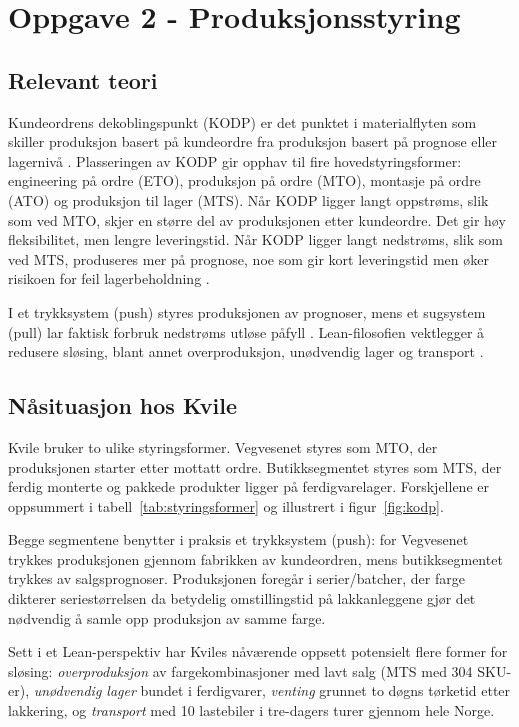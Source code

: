 \section*{Oppgave 2 - Produksjonsstyring}
\setcounter{section}{2}

\setcounter{subsection}{0}
\subsection{Relevant teori}
Kundeordrens dekoblingspunkt (KODP) er det punktet i materialflyten som skiller produksjon basert på kundeordre fra produksjon basert på prognose eller lagernivå \parencite{strandhagen2024}. Plasseringen av KODP gir opphav til fire hovedstyringsformer: engineering på ordre (ETO), produksjon på ordre (MTO), montasje på ordre (ATO) og produksjon til lager (MTS). Når KODP ligger langt oppstrøms, slik som ved MTO, skjer en større del av produksjonen etter kundeordre. Det gir høy fleksibilitet, men lengre leveringstid. Når KODP ligger langt nedstrøms, slik som ved MTS, produseres mer på prognose, noe som gir kort leveringstid men øker risikoen for feil lagerbeholdning \parencite{slack2019}.

I et trykksystem (push) styres produksjonen av prognoser, mens et sugsystem (pull) lar faktisk forbruk nedstrøms utløse påfyll \parencite{strandhagen2024}. Lean-filosofien vektlegger å redusere sløsing, blant annet overproduksjon, unødvendig lager og transport \parencite{strandhagen2024}.


\subsection{Nåsituasjon hos Kvile}

Kvile bruker to ulike styringsformer. Vegvesenet styres som MTO, der produksjonen starter etter mottatt ordre. Butikksegmentet styres som MTS, der ferdig monterte og pakkede produkter ligger på ferdigvarelager. Forskjellene er oppsummert i tabell~\ref{tab:styringsformer} og illustrert i figur~\ref{fig:kodp}.

Begge segmentene benytter i praksis et trykksystem (push): for Vegvesenet trykkes produksjonen gjennom fabrikken av kundeordren, mens butikksegmentet trykkes av salgsprognoser. Produksjonen foregår i serier/batcher, der farge dikterer seriestørrelsen da betydelig omstillingstid på lakkanleggene gjør det nødvendig å samle opp produksjon av samme farge.

Sett i et Lean-perspektiv har Kviles nåværende oppsett potensielt flere former for sløsing: \textit{overproduksjon} av fargekombinasjoner med lavt salg (MTS med 304 SKU-er), \textit{unødvendig lager} bundet i ferdigvarer, \textit{venting} grunnet to døgns tørketid etter lakkering, og \textit{transport} med 10 lastebiler i tre-dagers turer gjennom hele Norge.

